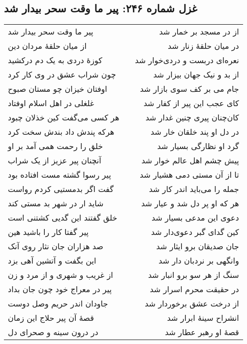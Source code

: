 \begin{center}
\section*{غزل شماره ۲۴۶: پیر ما وقت سحر بیدار شد}
\label{sec:246}
\begin{longtable}{l p{0.5cm} r}
پیر ما وقت سحر بیدار شد
&&
از در مسجد بر خمار شد
\\
از میان حلقهٔ مردان دین
&&
در میان حلقهٔ زنار شد
\\
کوزهٔ دردی به یک دم درکشید
&&
نعره‌ای دربست و دردی‌خوار شد
\\
چون شراب عشق در وی کار کرد
&&
از بد و نیک جهان بیزار شد
\\
اوفتان خیزان چو مستان صبوح
&&
جام می بر کف سوی بازار شد
\\
غلغلی در اهل اسلام اوفتاد
&&
کای عجب این پیر از کفار شد
\\
هر کسی می‌گفت کین خذلان چبود
&&
کان‌چنان پیری چنین غدار شد
\\
هرکه پندش داد بندش سخت کرد
&&
در دل او پند خلقان خار شد
\\
خلق را رحمت همی آمد بر او
&&
گرد او نظارگی بسیار شد
\\
آنچنان پیر عزیز از یک شراب
&&
پیش چشم اهل عالم خوار شد
\\
پیر رسوا گشته مست افتاده بود
&&
تا از آن مستی دمی هشیار شد
\\
گفت اگر بدمستیی کردم رواست
&&
جمله را می‌باید اندر کار شد
\\
شاید ار در شهر بد مستی کند
&&
هر که او پر دل شد و عیار شد
\\
خلق گفتند این گدیی کشتنی است
&&
دعوی این مدعی بسیار شد
\\
پیر گفتا کار را باشید هین
&&
کین گدای گبر دعوی‌دار شد
\\
صد هزاران جان نثار روی آنک
&&
جان صدیقان برو ایثار شد
\\
این بگفت و آتشین آهی بزد
&&
وانگهی بر نردبان دار شد
\\
از غریب و شهری و از مرد و زن
&&
سنگ از هر سو برو انبار شد
\\
پیر در معراج خود چون جان بداد
&&
در حقیقت محرم اسرار شد
\\
جاودان اندر حریم وصل دوست
&&
از درخت عشق برخوردار شد
\\
قصهٔ آن پیر حلاج این زمان
&&
انشراح سینهٔ ابرار شد
\\
در درون سینه و صحرای دل
&&
قصهٔ او رهبر عطار شد
\\
\end{longtable}
\end{center}
